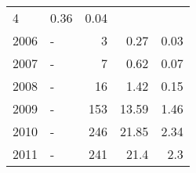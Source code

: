 \begin{longtable}{lXrrr}
       \num{4} &
       \num[round-mode=places,round-precision=2]{0,36} &
         \num[round-mode=places,round-precision=2]{0,04} \\

     2006 &
     \multicolumn{1}{X}{ -  } &


       \num{3} &
       \num[round-mode=places,round-precision=2]{0,27} &
         \num[round-mode=places,round-precision=2]{0,03} \\

     2007 &
     \multicolumn{1}{X}{ -  } &


       \num{7} &
       \num[round-mode=places,round-precision=2]{0,62} &
         \num[round-mode=places,round-precision=2]{0,07} \\

     2008 &
     \multicolumn{1}{X}{ -  } &


       \num{16} &
       \num[round-mode=places,round-precision=2]{1,42} &
         \num[round-mode=places,round-precision=2]{0,15} \\

     2009 &
     \multicolumn{1}{X}{ -  } &


       \num{153} &
       \num[round-mode=places,round-precision=2]{13,59} &
         \num[round-mode=places,round-precision=2]{1,46} \\

     2010 &
     \multicolumn{1}{X}{ -  } &


       \num{246} &
       \num[round-mode=places,round-precision=2]{21,85} &
         \num[round-mode=places,round-precision=2]{2,34} \\

     2011 &
     \multicolumn{1}{X}{ -  } &


       \num{241} &
       \num[round-mode=places,round-precision=2]{21,4} &
         \num[round-mode=places,round-precision=2]{2,3} \\


\end{longtable}
